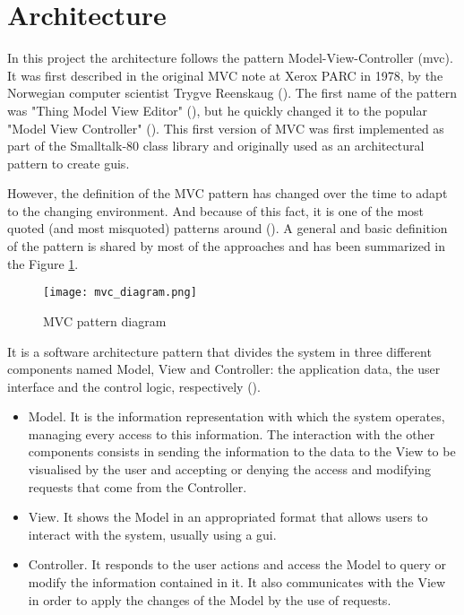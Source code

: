 \section{Architecture}
\label{sec:architecture}
In this project the architecture follows the pattern Model-View-Controller (\gls{mvc}). It was first described in the original MVC note at Xerox PARC in 1978, by the Norwegian computer scientist Trygve Reenskaug (\cite{mvc_origin}). The first name of the pattern was "Thing Model View Editor" (\cite{tmve_reenskaug_1979}), but he quickly changed it to the popular "Model View Controller" (\cite{mvc_reenskaug_1979}). This first version of MVC was first implemented as part of the Smalltalk-80 class library and originally used as an architectural pattern to create \glspl{gui}.

However, the definition of the MVC pattern has changed over the time to adapt to the changing environment. And because of this fact, it is one of the most quoted (and most misquoted) patterns around (\cite{current_mvc_definition}). A general and basic definition of the pattern is shared by most of the approaches and has been summarized in the Figure \ref{fig:mvc_diagram}.   

\begin{figure}[!ht]
	\centering
	\texttt{[image: mvc\_diagram.png]}
	\caption{MVC pattern diagram}
	\label{fig:mvc_diagram}
\end{figure}	

It is a software architecture pattern that divides the system in three different components named Model, View and Controller: the application data, the user interface and the control logic, respectively (\cite{mvc_components_definition}).
\begin{itemize}
	\item Model. It is the information representation with which the system operates, managing every access to this information. The interaction with the other components consists in 	sending the information to the data to the View to be visualised by the user and accepting or denying the access and modifying requests that come from the Controller.
	\item View. It shows the Model in an appropriated format that allows users to interact with the system, usually using a \gls{gui}.
	\item Controller. It responds to the user actions and access the Model to query or modify the information contained in it. It also communicates with the View in order to apply the changes of the Model by the use of requests. 
\end{itemize}

